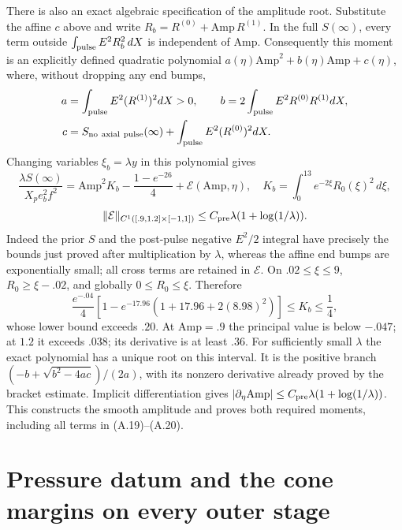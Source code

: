 \documentclass[10pt,a4paper]{article}
\begin{document}
There is also an exact algebraic specification of the amplitude root. Substitute
the affine $c$ above and write $R_b=R^{(0)}+\mathrm{Amp}\,R^{(1)}$.
In the full $S(\infty)$, every term outside $\int_{\rm pulse}E^2R_b^2\,dX$
is independent of $\mathrm{Amp}$. Consequently this moment is an explicitly
defined quadratic polynomial $a(\eta)\mathrm{Amp}^2+b(\eta)\mathrm{Amp}+c(\eta)$,
where, without dropping any end bumps,
\[
\begin{aligned}
a&=\int_{\rm pulse}E^2(R^{(1)})^2dX>0,\qquad
b=2\int_{\rm pulse}E^2R^{(0)}R^{(1)}dX,\\
c&=S_{\rm no\ axial\ pulse}(\infty)+\int_{\rm pulse}E^2(R^{(0)})^2dX.
\end{aligned}
\]
Changing variables $\xi_b=\lambda y$ in this polynomial gives
\[
\frac{\lambda S(\infty)}{X_pe_b^2f^2}
=\mathrm{Amp}^2K_b-\frac{1-e^{-26}}4+\mathcal E(\mathrm{Amp},\eta),
\quad K_b=\int_0^{13}e^{-2\xi}R_0(\xi)^2\,d\xi,
\]
\[
\|\mathcal E\|_{C^1([.9,1.2]\times[-1,1])}
\le C_{\rm pre}\lambda(1+\log(1/\lambda)).
\]
Indeed the prior $S$ and the post-pulse negative $E^2/2$ integral have precisely
the bounds just proved after multiplication by $\lambda$, whereas the affine
end bumps are exponentially small; all cross terms are retained in
$\mathcal E$. On $.02\le\xi\le9$, $R_0\ge\xi-.02$, and globally
$0\le R_0\le\xi$. Therefore
\[
\frac{e^{-.04}}4\left[1-e^{-17.96}(1+17.96+2(8.98)^2)\right]
\le K_b\le\frac14,
\]
whose lower bound exceeds $.20$. At $\mathrm{Amp}=.9$ the principal value
is below $-.047$; at $1.2$ it exceeds $.038$; its derivative is at least $.36$.
For sufficiently small $\lambda$ the exact polynomial has a unique root on
this interval. It is the positive branch
$(-b+\sqrt{b^2-4ac})/(2a)$, with its nonzero derivative already proved by
the bracket estimate. Implicit differentiation gives
$|\partial_\eta\mathrm{Amp}|\le C_{\rm pre}\lambda(1+\log(1/\lambda))$.
This constructs the smooth amplitude and proves both required moments, including
all terms in (A.19)--(A.20).

\section{Pressure datum and the cone margins on every outer stage}
\end{document}
